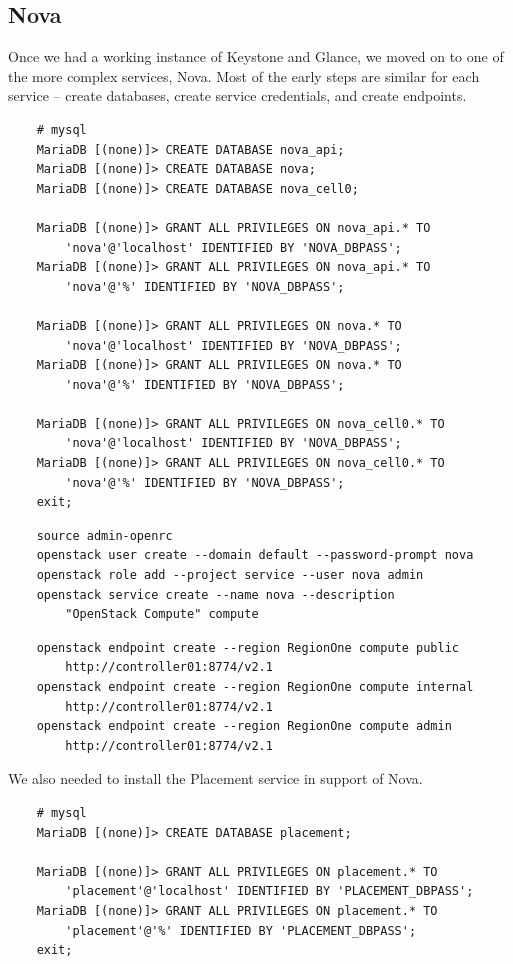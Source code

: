 \documentclass{article}
\begin{document}
\subsection{Nova}
Once we had a working instance of Keystone and Glance, we moved on to one of the more complex services, Nova. Most of the early steps are similar for each service -- create databases, create service credentials, and create endpoints.

\begin{verbatim}
    # mysql
    MariaDB [(none)]> CREATE DATABASE nova_api;
    MariaDB [(none)]> CREATE DATABASE nova;
    MariaDB [(none)]> CREATE DATABASE nova_cell0;

    MariaDB [(none)]> GRANT ALL PRIVILEGES ON nova_api.* TO
        'nova'@'localhost' IDENTIFIED BY 'NOVA_DBPASS';
    MariaDB [(none)]> GRANT ALL PRIVILEGES ON nova_api.* TO 
        'nova'@'%' IDENTIFIED BY 'NOVA_DBPASS';

    MariaDB [(none)]> GRANT ALL PRIVILEGES ON nova.* TO 
        'nova'@'localhost' IDENTIFIED BY 'NOVA_DBPASS';
    MariaDB [(none)]> GRANT ALL PRIVILEGES ON nova.* TO 
        'nova'@'%' IDENTIFIED BY 'NOVA_DBPASS';

    MariaDB [(none)]> GRANT ALL PRIVILEGES ON nova_cell0.* TO 
        'nova'@'localhost' IDENTIFIED BY 'NOVA_DBPASS';
    MariaDB [(none)]> GRANT ALL PRIVILEGES ON nova_cell0.* TO 
        'nova'@'%' IDENTIFIED BY 'NOVA_DBPASS';
    exit;
\end{verbatim}

\begin{verbatim}
    source admin-openrc
    openstack user create --domain default --password-prompt nova
    openstack role add --project service --user nova admin
    openstack service create --name nova --description 
        "OpenStack Compute" compute
\end{verbatim}

\begin{verbatim}
    openstack endpoint create --region RegionOne compute public 
        http://controller01:8774/v2.1
    openstack endpoint create --region RegionOne compute internal 
        http://controller01:8774/v2.1        
    openstack endpoint create --region RegionOne compute admin 
        http://controller01:8774/v2.1
\end{verbatim}

We also needed to install the Placement service in support of Nova.

\begin{verbatim}
    # mysql
    MariaDB [(none)]> CREATE DATABASE placement;

    MariaDB [(none)]> GRANT ALL PRIVILEGES ON placement.* TO
        'placement'@'localhost' IDENTIFIED BY 'PLACEMENT_DBPASS';
    MariaDB [(none)]> GRANT ALL PRIVILEGES ON placement.* TO
        'placement'@'%' IDENTIFIED BY 'PLACEMENT_DBPASS';
    exit;
\end{verbatim}
\end{document}
